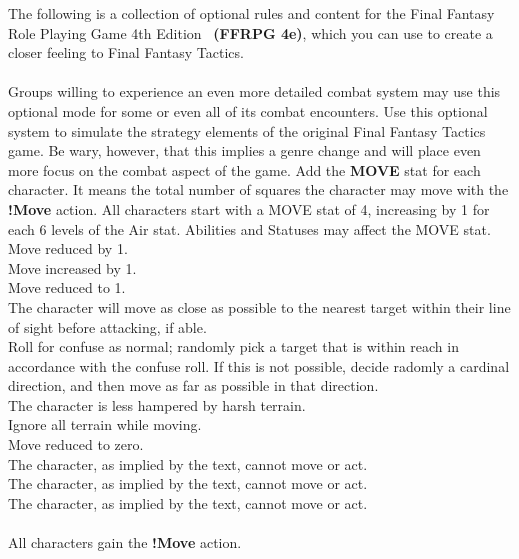 %
The following is a collection of optional rules and content for the Final Fantasy Role Playing Game 4th Edition~ \textbf{(FFRPG 4e)}, which you can use to create a closer feeling to Final Fantasy Tactics.
%
\\\\
%
 \ofrow
Groups willing to experience an even more detailed combat system may use this optional mode for some or even all of its combat encounters. 
Use this optional system to simulate the strategy elements of the original Final Fantasy Tactics game. 
Be wary, however, that this implies a genre change and will place even more focus on the combat aspect of the game.
%
\ofrow
%
 Add the \textbf{MOVE} stat for each character. 
It means the total number of squares the character may move with the \textbf{!Move} action. 
All characters start with a MOVE stat of 4, increasing by 1 for each 6 levels of the Air stat. Abilities and Statuses may affect the MOVE stat.\\
 Move reduced by 1.\\
 Move increased by 1.\\
 Move reduced to 1.\\
 The character will move as close as possible to the nearest target within their line of sight before attacking, if able.\\
 Roll for confuse as normal; randomly pick a target that is within reach in accordance with the confuse roll. 
If this is not possible, decide radomly a cardinal direction, and then move as far as possible in that direction.\\
 The character is less hampered by harsh terrain.\\
 Ignore all terrain while moving.\\
 Move reduced to zero.\\
 The character, as implied by the text, cannot move or act.\\
 The character, as implied by the text, cannot move or act.\\
 The character, as implied by the text, cannot move or act.
%
\\\\
%
 All characters gain the \textbf{!Move} action.
